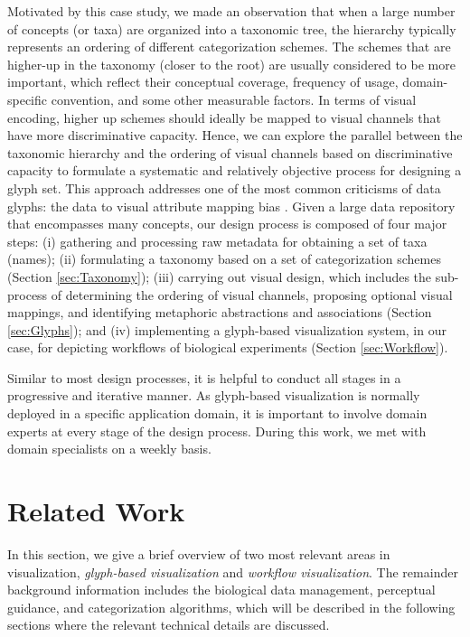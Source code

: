 Motivated by this case study, we made an observation that when a large number of concepts (or taxa) are organized into a taxonomic tree, the hierarchy typically represents an ordering of different categorization schemes.
The schemes that are higher-up in the taxonomy (closer to the root) are usually considered to be more important, which reflect their conceptual coverage, frequency of usage, domain-specific convention, and some other measurable factors.
In terms of visual encoding, higher up schemes should ideally be mapped to visual channels that have more discriminative capacity.
Hence, we can explore the parallel between the taxonomic hierarchy and the ordering of visual channels based on discriminative capacity to formulate a systematic and relatively objective process for designing a glyph set. This approach addresses one of the most common criticisms of data glyphs: the data to visual attribute mapping bias \cite{ward08}. 
Given a large data repository that encompasses many concepts, our design process is composed of four major steps:
(i) gathering and processing raw metadata for obtaining a set of taxa (names);
(ii) formulating a taxonomy based on a set of categorization schemes (Section \ref{sec:Taxonomy});
(iii) carrying out visual design, which includes the sub-process of determining the ordering of visual channels, proposing optional visual mappings, and identifying metaphoric abstractions and associations (Section \ref{sec:Glyphs}); and
(iv) implementing a glyph-based visualization system, in our case, for depicting workflows of biological experiments (Section \ref{sec:Workflow}).

Similar to most design processes, it is helpful to conduct all stages in a progressive and iterative manner.
As glyph-based visualization is normally deployed in a specific application domain, it is important to involve domain experts at every stage of the design process.
During this work, we met with domain specialists on a weekly basis.

\section{Related Work}
\label{sec:RelatedWork}
In this section, we give a brief overview of two most relevant areas in visualization, \emph{glyph-based visualization} and \emph{workflow visualization}.
The remainder background information includes the biological data management, perceptual guidance, and categorization algorithms, which will be described in the following sections where the relevant technical details are discussed.

